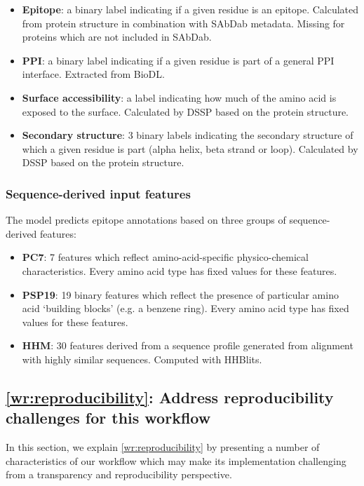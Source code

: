 \begin{itemize}
    \item \textbf{Epitope}: a binary label indicating if a given residue is an epitope. Calculated from protein structure in combination with SAbDab metadata. Missing for proteins which are not included in SAbDab.
    \item \textbf{PPI}: a binary label indicating if a given residue is part of a general PPI interface. Extracted from BioDL.
    \item \textbf{Surface accessibility}: a label indicating how much of the amino acid is exposed to the surface. Calculated by DSSP \cite{kabschDictionaryProteinSecondary1983} based on the protein structure.
    \item \textbf{Secondary structure}: 3 binary labels indicating the secondary structure of which a given residue is part (alpha helix, beta strand or loop). Calculated by DSSP based on the protein structure. 
\end{itemize}

\subsubsection{Sequence-derived input features}
The model predicts epitope annotations based on three groups of sequence-derived features:
\begin{itemize}
    \item \textbf{PC7}: 7 features which reflect amino-acid-specific physico-chemical characteristics. Every amino acid type has fixed values for these features.
    \item \textbf{PSP19}: 19 binary features which reflect the presence of particular amino acid `building blocks' (e.g. a benzene ring). Every amino acid type has fixed values for these features.
    \item \textbf{HHM}: 30 features derived from a sequence profile generated from alignment with highly similar sequences. Computed with HHBlits.
\end{itemize}

\subsection{\ref{wr:reproducibility}: Address reproducibility challenges for this workflow}
\label{sec:wf_reproducibility}

In this section, we explain \ref{wr:reproducibility} by presenting a number of characteristics of our workflow which may make its implementation challenging from a transparency and reproducibility perspective.


